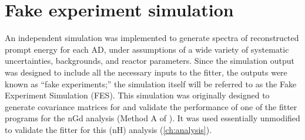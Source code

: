 




\section{Fake experiment simulation}
\label{sec:lbnl_toymc}

An independent simulation was implemented
to generate spectra of reconstructed prompt energy for each AD,
under assumptions of a wide variety of systematic uncertainties,
backgrounds, and reactor parameters.
Since the simulation output was designed to include all the necessary inputs
to the \thetaot{} fitter,
the outputs were known as ``fake experiments;''
the simulation itself will be referred to as the Fake Experiment Simulation (FES).
This simulation was originally \cite{lbnl_toymc,p12e_fitter,p14a_fitter} designed to generate covariance matrices for
and validate the performance of
one of the fitter programs for the nGd analysis
(Method A of \cite{ngd2016}).
It was used essentially unmodified to validate the fitter for this (nH) analysis
(\cref{ch:analysis}).


